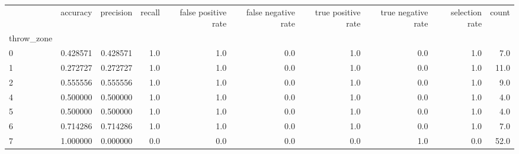 \begin{tabular}{lrrrrrrrrr}
\toprule
{} &  accuracy &  precision &  recall &  false positive rate &  false negative rate &  true positive rate &  true negative rate &  selection rate &  count \\
throw\_zone &           &            &         &                      &                      &                     &                     &                 &        \\
\midrule
0          &  0.428571 &   0.428571 &     1.0 &                  1.0 &                  0.0 &                 1.0 &                 0.0 &             1.0 &    7.0 \\
1          &  0.272727 &   0.272727 &     1.0 &                  1.0 &                  0.0 &                 1.0 &                 0.0 &             1.0 &   11.0 \\
2          &  0.555556 &   0.555556 &     1.0 &                  1.0 &                  0.0 &                 1.0 &                 0.0 &             1.0 &    9.0 \\
4          &  0.500000 &   0.500000 &     1.0 &                  1.0 &                  0.0 &                 1.0 &                 0.0 &             1.0 &    4.0 \\
5          &  0.500000 &   0.500000 &     1.0 &                  1.0 &                  0.0 &                 1.0 &                 0.0 &             1.0 &    4.0 \\
6          &  0.714286 &   0.714286 &     1.0 &                  1.0 &                  0.0 &                 1.0 &                 0.0 &             1.0 &    7.0 \\
7          &  1.000000 &   0.000000 &     0.0 &                  0.0 &                  0.0 &                 0.0 &                 1.0 &             0.0 &   52.0 \\
\bottomrule
\end{tabular}
